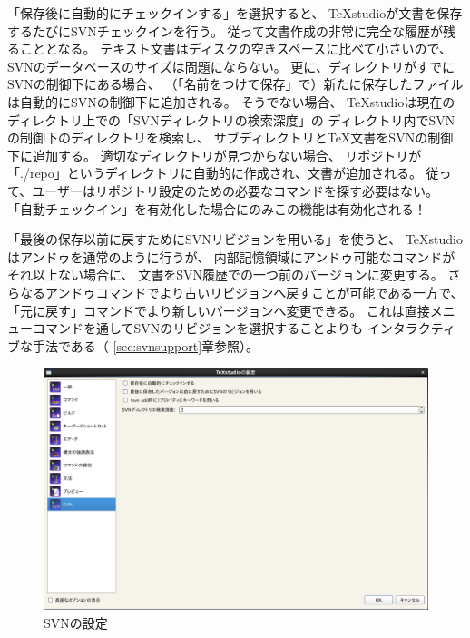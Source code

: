 「保存後に自動的にチェックインする」を選択すると、
TeXstudioが文書を保存するたびにSVNチェックインを行う。
従って文書作成の非常に完全な履歴が残ることとなる。
テキスト文書はディスクの空きスペースに比べて小さいので、
SVNのデータベースのサイズは問題にならない。
更に、ディレクトリがすでにSVNの制御下にある場合、
（「名前をつけて保存」で）新たに保存したファイルは自動的にSVNの制御下に追加される。
そうでない場合、
TeXstudioは現在のディレクトリ上での「SVNディレクトリの検索深度」の
ディレクトリ内でSVNの制御下のディレクトリを検索し、
サブディレクトリとTeX文書をSVNの制御下に追加する。
適切なディレクトリが見つからない場合、
リポジトリが「./repo」というディレクトリに自動的に作成され、文書が追加される。
従って、ユーザーはリポジトリ設定のための必要なコマンドを探す必要はない。
「自動チェックイン」を有効化した場合にのみこの機能は有効化される！

「最後の保存以前に戻すためにSVNリビジョンを用いる」を使うと、
TeXstudioはアンドゥを通常のように行うが、
内部記憶領域にアンドゥ可能なコマンドがそれ以上ない場合に、
文書をSVN履歴での一つ前のバージョンに変更する。
さらなるアンドゥコマンドでより古いリビジョンへ戻すことが可能である一方で、
「元に戻す」コマンドでより新しいバージョンへ変更できる。
これは直接メニューコマンドを通してSVNのリビジョンを選択することよりも
インタラクティブな手法である（
\ref{sec:svnsupport}章参照）。

\begin{figure}[H]
  \centering
  \includegraphics[width=.8\linewidth]{configure_svn.png}
  \caption{SVNの設定}
\end{figure}
